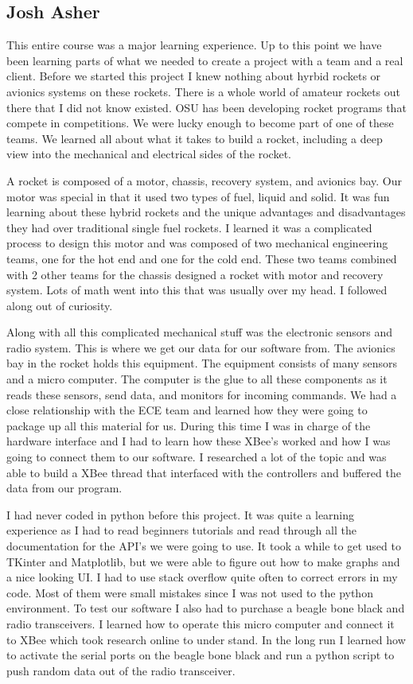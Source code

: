 \documentclass[10pt,draftclsnofoot,onecolumn,retainorgcmds]{IEEEtran}
\begin{document}
\subsection{Josh Asher}
This entire course was a major learning experience. Up to this point we have been learning parts of what we needed to create a project with a team and a real client. Before we started this project I knew nothing about hyrbid rockets or avionics systems on these rockets.  There is a whole world of amateur rockets out there that I did not know existed. OSU has been developing rocket programs that compete in competitions. We were lucky enough to become part of one of these teams. We learned all about what it takes to build a rocket, including a deep view into the mechanical and electrical sides of the rocket. \par
A rocket is composed of a motor, chassis, recovery system, and avionics bay. Our motor was special in that it used two types of fuel, liquid and solid. It was fun learning about these hybrid rockets and the unique advantages and disadvantages they had over traditional single fuel rockets. I learned it was a complicated process to design this motor and was composed of two mechanical engineering teams, one for the hot end and one for the cold end. These two teams combined with 2 other teams for the chassis designed a rocket with motor and recovery system. Lots of math went into this that was usually over my head. I followed along out of curiosity. \par
Along with all this complicated mechanical stuff was the electronic sensors and radio system. This is where we get our data for our software from. The avionics bay in the rocket holds this equipment. The equipment consists of many sensors and a micro computer. The computer is the glue to all these components as it reads these sensors, send data, and monitors for incoming commands. We had a close relationship with the ECE team and learned how they were going to package up all this material for us. During this time I was in charge of the hardware interface and I had to learn how these XBee's worked and how I was going to connect them to our software. I researched a lot of the topic and was able to build a XBee thread that interfaced with the controllers and buffered the data from our program. \par
I had never coded in python before this project. It was quite a learning experience as I had to read beginners tutorials and read through all the documentation for the API's we were going to use. It took a while to get used to TKinter and Matplotlib, but we were able to figure out how to make graphs and a nice looking UI. I had to use stack overflow quite often to correct errors in my code. Most of them were small mistakes since I was not used to the python environment. To test our software I also had to purchase a beagle bone black and radio transceivers. I learned how to operate this micro computer and connect it to XBee which took research online to under stand. In the long run I learned how to activate the serial ports on the beagle bone black and run a python script to push random data out of the radio transceiver. \par	
\end{document}
